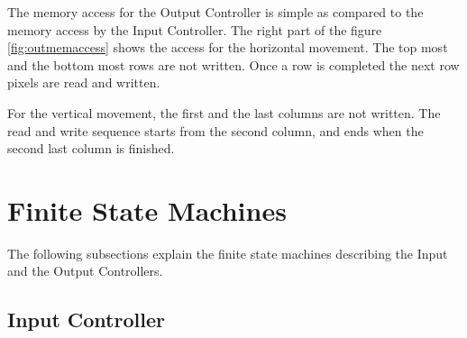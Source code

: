 \documentclass[11pt,a4paper]{article}
\begin{document}
The memory access for the Output Controller is simple as compared to the memory access by the Input Controller. The right part of the figure \ref{fig:outmemaccess} shows the access for the horizontal movement. The top most and the bottom most rows are not written. Once a row is completed the next row pixels are read and written.

For the vertical movement, the first and the last columns are not written. The read and write sequence starts from the second column, and ends when the second last column is finished.


\section{Finite State Machines}
\label{sec:controller}

The following subsections explain the finite state machines describing the Input and the Output Controllers.

\subsection{Input Controller}
\end{document}
